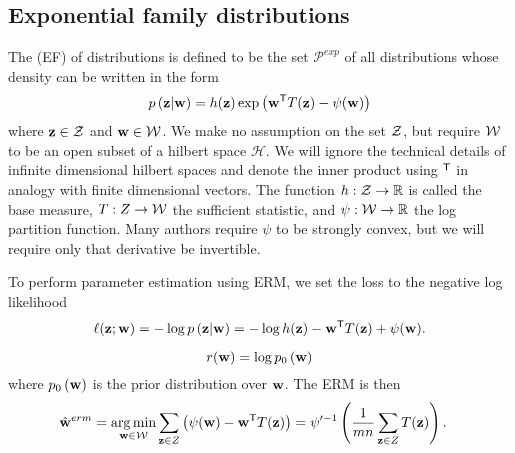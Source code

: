 \documentclass[thesis.tex]{subfiles}
\newcommand{\set}[1]{\mathcal {#1}}
\newcommand{\p}[1]{p\left({#1}\right)}
\newcommand{\prior}[1]{p_0\left({#1}\right)}
\newcommand{\Pdist}{\mathcal P}
\newcommand{\Pexp}{\Pdist^\textit{exp}}
\begin{document}

\subsection{Exponential family distributions}
\label{sec:merge:ef}


The  (EF) of distributions is defined to be the set $\Pexp$ of all distributions whose density can be written in the form
\begin{equation}
    \p{\z | \w} = h(\z)\exp\left(\trans{\w} T(\z) - \psi(\w)\right)
\end{equation}
where $\mathbf z\in{\mathcal Z}$ and $\mathbf w\in{\mathcal W}$.
We make no assumption on the set ${\mathcal Z}$, but require ${\mathcal W}$ to be an open subset of a hilbert space $\set H$.
We will ignore the technical details of infinite dimensional hilbert spaces and denote the inner product using ${}^{\mathsf{T}}$ in analogy with finite dimensional vectors.
The function $h : {\mathcal Z}\to\mathbb R$ is called the base measure,
$T : Z \to {\mathcal W}$ the sufficient statistic,
and $\psi : {\mathcal W} \to \mathbb R$ the log partition function.
Many authors require $\psi$ to be strongly convex,
but we will require only that derivative be invertible.

To perform parameter estimation using ERM,
we set the loss to the negative log likelihood 
\begin{equation}
    \loss(\z;\w) 
    = -\log\p{\z|\w}
    = -\log h(\z) - \trans\w T(\z) + \psi(\w)
    .
\end{equation}

\begin{equation}
    \reg(\w) = \log\prior\w
\end{equation}
where $\prior\w$ is the prior distribution over $\mathbf w$.
The ERM is then
\newcommand{\deriv}[2]{\frac{\dd {#1}}{\dd {#2}}}
\begin{align}
    \label{eq:ef:erm}
    \hat{\mathbf w}^{erm} 
    &= \operatorname*{arg\,min}_{\mathbf w\in{\mathcal W}} \sum_{\mathbf z\in Z}\left( \psi(\mathbf w) - {\mathbf w}^{\mathsf{T}} T(\mathbf z)\right)
    = \psi'^{-1} \left(\frac{1}{mn} \sum_{\mathbf z\in Z} T(\mathbf z) \right)
    .
\end{align}
\end{document}
